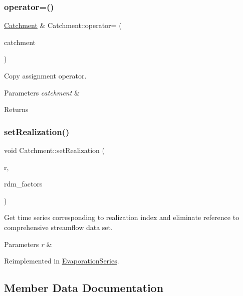 \subsubsection{\texorpdfstring{operator=()}{operator=()}}
{\footnotesize\ttfamily \mbox{\hyperlink{classCatchment}{Catchment}} \& Catchment\+::operator= (\begin{DoxyParamCaption}\item[{const \mbox{\hyperlink{classCatchment}{Catchment}} \&}]{catchment }\end{DoxyParamCaption})\hspace{0.3cm}{\ttfamily [default]}}

Copy assignment operator. 
\begin{DoxyParams}{Parameters}
{\em catchment} & \\
\hline
\end{DoxyParams}
\begin{DoxyReturn}{Returns}

\end{DoxyReturn}
\mbox{\label{classCatchment_affb9042c5854a76efd864ce87d7d1877}} 
\subsubsection{\texorpdfstring{set\+Realization()}{setRealization()}}
{\footnotesize\ttfamily void Catchment\+::set\+Realization (\begin{DoxyParamCaption}\item[{unsigned long}]{r,  }\item[{vector$<$ double $>$ \&}]{rdm\+\_\+factors }\end{DoxyParamCaption})\hspace{0.3cm}{\ttfamily [virtual]}}

Get time series corresponding to realization index and eliminate reference to comprehensive streamflow data set. 
\begin{DoxyParams}{Parameters}
{\em r} & \\
\hline
\end{DoxyParams}


Reimplemented in \mbox{\hyperlink{classEvaporationSeries_a4985ac4c81ec111657861e5750b24c0e}{Evaporation\+Series}}.



\subsection{Member Data Documentation}
\mbox{\label{classCatchment_a20548a9d03f0d39f297cb15b3c0433ad}} 
